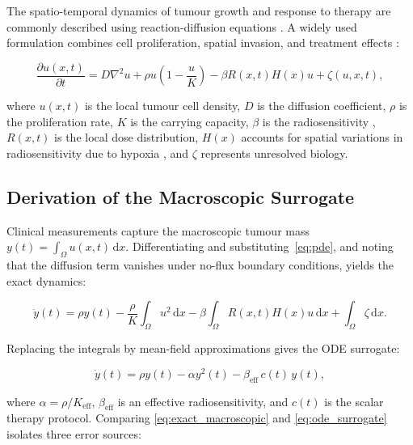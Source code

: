 \documentclass[runningheads]{llncs}
\begin{document}
The spatio-temporal dynamics of tumour growth and response to therapy are commonly
described using reaction-diffusion equations \cite{murray2002mathematical,cristini2010multiscale}.
A widely used formulation combines cell proliferation, spatial invasion, and
treatment effects \cite{swanson2000quantitative,jarrett2020optimal}:

\begin{equation} \label{eq:pde}
    \frac{\partial u(x, t)}{\partial t} = D \nabla^2 u
        + \rho u \!\left(1 - \frac{u}{K}\right)
        - \beta R(x, t) H(x) u
        + \zeta(u, x, t),
\end{equation}

where $u(x,t)$ is the local tumour cell density, $D$ is the diffusion coefficient,
$\rho$ is the proliferation rate, $K$ is the carrying capacity, $\beta$ is the
radiosensitivity \cite{brenner2008linear,hall2006radiobiology}, $R(x,t)$ is the
local dose distribution, $H(x)$ accounts for spatial variations in radiosensitivity
due to hypoxia \cite{vaupel2004hypoxia,tannock1972relation}, and $\zeta$ represents
unresolved biology.

\subsection{Derivation of the Macroscopic Surrogate}

Clinical measurements capture the macroscopic tumour mass
$y(t) = \int_\Omega u(x,t)\,\mathrm{d}x$.
Differentiating and substituting~\eqref{eq:pde}, and noting that the diffusion term
vanishes under no-flux boundary conditions, yields the exact dynamics:

\begin{equation} \label{eq:exact_macroscopic}
    \dot{y}(t) = \rho y(t)
        - \frac{\rho}{K} \!\int_\Omega u^2\,\mathrm{d}x
        - \beta \!\int_\Omega R(x,t)H(x)u\,\mathrm{d}x
        + \!\int_\Omega \zeta\,\mathrm{d}x.
\end{equation}

Replacing the integrals by mean-field approximations gives the ODE surrogate:

\begin{equation} \label{eq:ode_surrogate}
    \dot{y}(t) = \rho y(t) - \alpha y^2(t) - \beta_{\mathrm{eff}}\, c(t)\, y(t),
\end{equation}

where $\alpha = \rho/K_{\mathrm{eff}}$, $\beta_{\mathrm{eff}}$ is an effective
radiosensitivity, and $c(t)$ is the scalar therapy protocol.  Comparing
\eqref{eq:exact_macroscopic} and \eqref{eq:ode_surrogate} isolates three error
sources:
\end{document}
